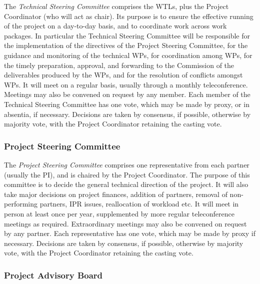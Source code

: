 \documentclass[a4paper,11pt]{article}
\begin{document}
The \emph{Technical Steering Committee} comprises the WTLs, plus the
Project Coordinator (who will act as chair).  Its purpose is to ensure
the effective running of the project on a day-to-day basis, and to
coordinate work across work packages.  In particular the Technical Steering
Committee will be
responsible for the implementation of the directives of the Project Steering
Committee, for the
guidance and monitoring of the technical WPs, for coordination among
WPs, for  the timely preparation, approval, and forwarding to the Commission
of the deliverables produced by the WPs, and for the resolution of conflicts
amongst WPs.  It will meet on a regular basis, usually through a monthly
teleconference.  Meetings may also be convened on request by any member.
Each member of the Technical Steering Committee has one vote,
which may be made by proxy, or in absentia, if necessary.  
Decisions are taken by consensus, if possible, otherwise by majority vote, 
with the
Project Coordinator retaining the casting vote.

\subsubsection*{Project Steering Committee}
\vspace{-6pt}

The \emph{Project Steering Committee} comprises one representative from each partner
(usually the PI), and is chaired by the Project Coordinator.  
The purpose of this committee is to decide
the general technical direction of the project.  It will also
take major decisions on project finances, addition of partners, removal of non-performing
partners, IPR issues, reallocation of workload etc.  It will meet in person
at least once per year, supplemented by more regular teleconference
meetings as required. Extraordinary meetings may also be convened on request by any partner.
Each representative has one vote, which
may be made by proxy if necessary.  Decisions are taken by
consensus, if possible, otherwise by majority vote, with the
Project Coordinator retaining the casting vote.

\subsubsection*{Project Advisory Board}
\vspace{-6pt}
\end{document}
